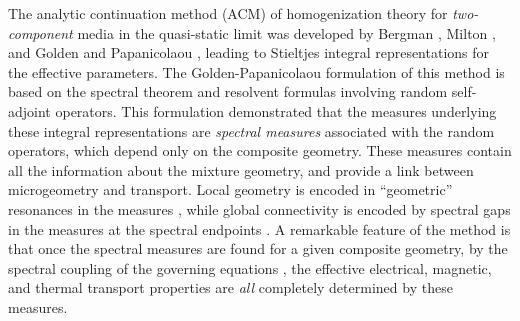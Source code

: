 \documentclass{cmslatex}
\begin{document}
The analytic continuation method (ACM) of homogenization theory
for \emph{two-component} media in the
quasi-static limit was developed by Bergman \cite{Bergman:PRL-1285},
Milton \cite{Milton:APL-300}, and Golden and Papanicolaou
\cite{Golden:CMP-473},
leading to Stieltjes integral representations for the effective
parameters.  The Golden-Papanicolaou formulation of this
method is based on the spectral theorem
and resolvent formulas involving random self-adjoint operators. This
formulation demonstrated that the measures underlying 
these integral representations are \emph{spectral measures} associated
with the random operators, which depend only on the composite
geometry. These measures contain all the information about the mixture
geometry, and provide a link between microgeometry and
transport. Local geometry is encoded in ``geometric'' resonances in
the measures \cite{Jonckheere_Luck_JPA_1998}, while global
connectivity is encoded by spectral gaps in the measures at the
spectral endpoints
\cite{Murphy:JMP:063506,Jonckheere_Luck_JPA_1998}. A remarkable
feature of the method is that once the spectral measures are found for
a given composite geometry, by the spectral coupling of the governing
equations
\cite{Cherkaev:IP-1203,MILTON:2002:TC,Cherkaev:2004:331,Cherkaev:PBCM:0921},
the effective electrical, magnetic, and thermal transport properties
are \emph{all} completely determined by these measures.
\end{document}
